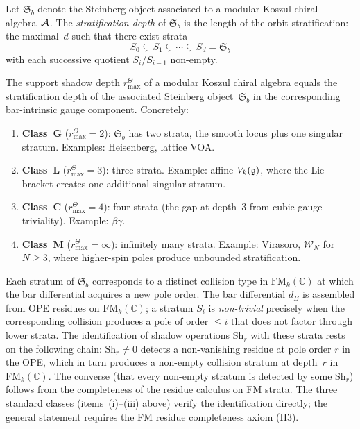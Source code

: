 \begin{definition}
Let $\mathfrak{S}_b$ denote the Steinberg object associated
to a modular Koszul chiral algebra~$\mathcal{A}$. The
\emph{stratification depth} of $\mathfrak{S}_b$ is the
length of the orbit stratification: the maximal~$d$ such
that there exist strata
\[
 S_0 \subsetneq S_1 \subsetneq \cdots \subsetneq S_d
 = \mathfrak{S}_b
\]
with each successive quotient $S_i / S_{i-1}$ non-empty.
\end{definition}

\begin{proposition}[Support depth = stratification depth]
\ClaimStatusConjectured
The support shadow depth \(r^\Theta_{\max}\) of a modular Koszul
chiral algebra equals the stratification depth of the associated
Steinberg object~$\mathfrak{S}_b$ in the corresponding bar-intrinsic
gauge component. Concretely:
\begin{enumerate}[label=\textup{(\roman*)}]
\item \textbf{Class~$\mathbf{G}$}
 (\(r^\Theta_{\max}=2\)): $\mathfrak{S}_b$ has two strata,
 the smooth locus plus one singular stratum.
 Examples: Heisenberg, lattice VOA.
\item \textbf{Class~$\mathbf{L}$}
 (\(r^\Theta_{\max}=3\)): three strata.
 Example: affine $V_k(\mathfrak{g})$, where the Lie bracket
 creates one additional singular stratum.
\item \textbf{Class~$\mathbf{C}$}
 (\(r^\Theta_{\max}=4\)): four strata
 (the gap at depth~$3$ from cubic gauge triviality).
 Example: $\beta\gamma$.
\item \textbf{Class~$\mathbf{M}$}
 (\(r^\Theta_{\max}=\infty\)): infinitely many strata.
 Example: Virasoro, $\mathcal{W}_N$ for $N \geq 3$, where
 higher-spin poles produce unbounded stratification.
\end{enumerate}
\end{proposition}

\begin{remark}[Evidence]
Each stratum of $\mathfrak{S}_b$ corresponds to a distinct
collision type in $\mathrm{FM}_k(\mathbb{C})$ at which the
bar differential acquires a new pole order. The bar
differential $d_B$ is assembled from OPE residues on
$\mathrm{FM}_k(\mathbb{C})$; a stratum $S_i$ is
\emph{non-trivial} precisely when the corresponding
collision produces a pole of order $\leq i$ that does not
factor through lower strata. The identification of shadow
operations $\mathrm{Sh}_r$ with these strata rests on
the following chain: $\mathrm{Sh}_r \neq 0$ detects a
non-vanishing residue at pole order $r$ in the OPE, which
in turn produces a non-empty collision stratum at depth~$r$
in $\mathrm{FM}_k(\mathbb{C})$. The converse (that every
non-empty stratum is detected by some $\mathrm{Sh}_r$)
follows from the completeness of the residue calculus on FM
strata. The three standard classes
(items~(i)--(iii) above) verify the identification directly; the
general statement requires the FM residue completeness axiom (H3).
\end{remark}

